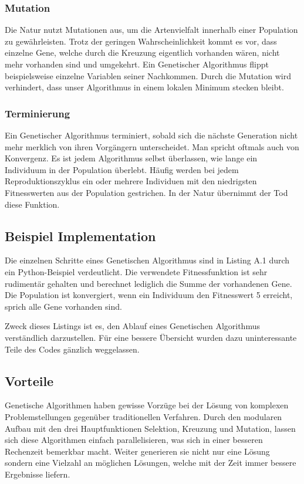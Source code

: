 \subsubsection{Mutation}
Die Natur nutzt Mutationen aus, um die Artenvielfalt innerhalb einer Population zu gewährleisten.
Trotz der geringen Wahrscheinlichkeit kommt es vor, dass einzelne Gene, welche durch die Kreuzung
eigentlich vorhanden wären, nicht mehr vorhanden sind und umgekehrt. Ein Genetischer Algorithmus
flippt beispielsweise einzelne Variablen seiner Nachkommen. Durch die Mutation wird verhindert,
dass unser Algorithmus in einem lokalen Minimum stecken bleibt.

\subsubsection{Terminierung}
Ein Genetischer Algorithmus terminiert, sobald sich die nächste Generation nicht mehr merklich von
ihren Vorgängern unterscheidet. Man spricht oftmals auch von Konvergenz. Es ist jedem Algorithmus
selbst überlassen, wie lange ein Individuum in der Population überlebt. Häufig werden bei jedem
Reproduktionszyklus ein oder mehrere Individuen mit den niedrigsten Fitnesswerten aus der Population
gestrichen. In der Natur übernimmt der Tod diese Funktion.

\subsection{Beispiel Implementation}
Die einzelnen Schritte eines Genetischen Algorithmus sind in Listing A.1 durch
ein Python-Beispiel verdeutlicht. Die verwendete Fitnessfunktion ist sehr rudimentär
gehalten und berechnet lediglich die Summe der vorhandenen Gene. Die Population ist konvergiert,
wenn ein Individuum den Fitnesswert 5 erreicht, sprich alle Gene vorhanden sind.

Zweck dieses Listings ist es, den Ablauf eines Genetischen Algorithmus verständlich darzustellen.
Für eine bessere Übersicht wurden dazu uninteressante Teile des Codes gänzlich weggelassen.

\subsection{Vorteile}
Genetische Algorithmen haben gewisse Vorzüge bei der Lösung von komplexen
Problemstellungen gegenüber traditionellen Verfahren. Durch den modularen Aufbau
mit den drei Hauptfunktionen Selektion, Kreuzung und Mutation, lassen sich diese
Algorithmen einfach parallelisieren, was sich in einer besseren Rechenzeit bemerkbar
macht. Weiter generieren sie nicht nur eine Lösung sondern eine Vielzahl an möglichen
Lösungen, welche mit der Zeit immer bessere Ergebnisse liefern. \cite{Gou19}

